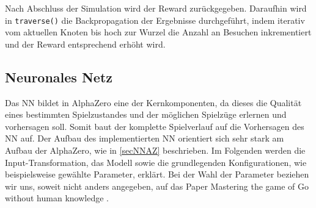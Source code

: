 \documentclass[12pt,a4paper]{article}
\begin{document}
Nach Abschluss der Simulation wird der Reward zurückgegeben. Daraufhin wird in \texttt{traverse()} die Backpropagation der Ergebnisse durchgeführt, indem iterativ vom aktuellen Knoten bis hoch zur Wurzel die Anzahl an Besuchen inkrementiert und der Reward entsprechend erhöht wird.

\subsection{Neuronales Netz}
Das NN bildet in AlphaZero eine der Kernkomponenten, da dieses die Qualität eines bestimmten Spielzustandes und der möglichen Spielzüge erlernen und vorhersagen soll. Somit baut der komplette Spielverlauf auf die Vorhersagen des NN auf. Der Aufbau des implementierten NN orientiert sich sehr stark am Aufbau der AlphaZero, wie in \ref{secNNAZ} beschrieben. Im Folgenden werden die Input-Transformation, das Modell sowie die grundlegenden Konfigurationen, wie beispielsweise gewählte Parameter, erklärt. Bei der Wahl der Parameter beziehen wir uns, soweit nicht anders angegeben, auf das Paper \glqq Mastering the game of Go without human knowledge\grqq{} \cite{Silver2017}. \\
\end{document}
